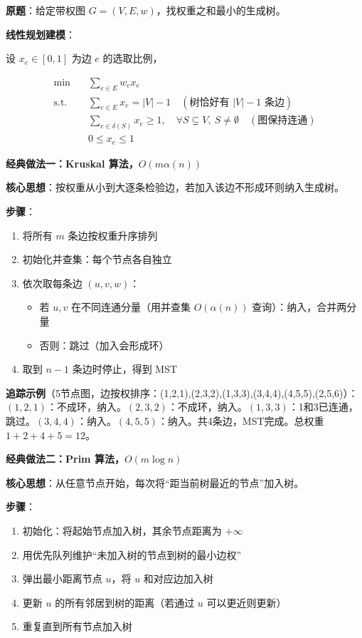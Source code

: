 \documentclass[12pt, a4paper]{ctexart}
\begin{document}
\begin{blackboard}

\textbf{原题}：给定带权图 $G = (V, E, w)$，找权重之和最小的生成树。

\textbf{线性规划建模}：

设 $x_e \in [0,1]$ 为边 $e$ 的选取比例，

\begin{align}
\min \quad & \sum_{e \in E} w_e x_e \\
\text{s.t.} \quad & \sum_{e \in E} x_e = |V| - 1 \quad (\text{树恰好有 }|V|-1\text{ 条边}) \\
& \sum_{e \in \delta(S)} x_e \geq 1, \quad \forall S \subsetneq V,\ S \neq \emptyset \quad (\text{图保持连通}) \\
& 0 \leq x_e \leq 1
\end{align}

\textbf{经典做法一：Kruskal 算法，$O(m\alpha(n))$}

\textbf{核心思想}：按权重从小到大逐条检验边，若加入该边不形成环则纳入生成树。

\textbf{步骤}：
\begin{enumerate}
    \item 将所有 $m$ 条边按权重升序排列
    \item 初始化并查集：每个节点各自独立
    \item 依次取每条边 $(u, v, w)$：
        \begin{itemize}
            \item 若 $u, v$ 在不同连通分量（用并查集 $O(\alpha(n))$ 查询）：纳入，合并两分量
            \item 否则：跳过（加入会形成环）
        \end{itemize}
    \item 取到 $n-1$ 条边时停止，得到 MST
\end{enumerate}

\textbf{追踪示例}（5节点图，边按权排序：(1,2,1),(2,3,2),(1,3,3),(3,4,4),(4,5,5),(2,5,6)）：\\
$(1,2,1)$：不成环，纳入。$(2,3,2)$：不成环，纳入。$(1,3,3)$：1和3已连通，跳过。$(3,4,4)$：纳入。$(4,5,5)$：纳入。共4条边，MST完成。总权重 $1+2+4+5=12$。

\textbf{经典做法二：Prim 算法，$O(m\log n)$}

\textbf{核心思想}：从任意节点开始，每次将``距当前树最近的节点''加入树。

\textbf{步骤}：
\begin{enumerate}
    \item 初始化：将起始节点加入树，其余节点距离为 $+\infty$
    \item 用优先队列维护``未加入树的节点到树的最小边权''
    \item 弹出最小距离节点 $u$，将 $u$ 和对应边加入树
    \item 更新 $u$ 的所有邻居到树的距离（若通过 $u$ 可以更近则更新）
    \item 重复直到所有节点加入树
\end{enumerate}


\end{blackboard}
\end{document}
